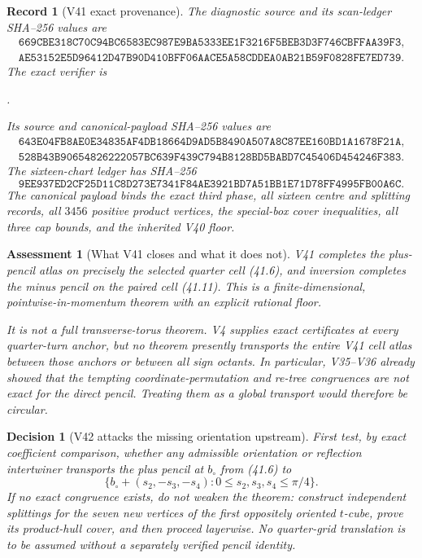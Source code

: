 \documentclass[11pt,oneside]{article}
\newtheorem{assessment}[theorem]{Assessment}
\newtheorem{record}[theorem]{Record}
\newtheorem{decision}[theorem]{Decision}
\theoremstyle{definition}
\theoremstyle{remark}
\begin{document}
\begin{record}[V41 exact provenance]
\label{rec:newv41-provenance}
The diagnostic source and its scan-ledger SHA--256 values are
\[
\begin{gathered}
\texttt{669CBE318C70C94BC6583EC987E9BA5333EE1F3216F5BEB3D3F746CBFFAA39F3},\\
\texttt{AE53152E5D96412D47B90D410BFF06AACE5A58CDDEA0AB21B59F0828FE7ED739}.
\end{gathered}                                         \tag{41.14}
\]
The exact verifier is
\begin{center}
\footnotesize
{}.
\end{center}
Its source and canonical-payload SHA--256 values are
\[
\begin{gathered}
\texttt{643E04FB8AE0E34835AF4DB18664D9AD5B8490A507A8C87EE160BD1A1678F21A},\\
\texttt{528B43B90654826222057BC639F439C794B8128BD5BABD7C45406D454246F383}.
\end{gathered}                                         \tag{41.15}
\]
The sixteen-chart ledger has SHA--256
\[
\texttt{9EE937ED2CF25D11C8D273E7341F84AE3921BD7A51BB1E71D78FF4995FB00A6C}.
                                                               \tag{41.16}
\]
The canonical payload binds the exact third phase, all sixteen
centre and splitting records, all \(3456\) positive product
vertices, the special-box cover inequalities, all three cap
bounds, and the inherited V40 floor.
\end{record}

\begin{assessment}[What V41 closes and what it does not]
\label{ass:newv41}
V41 completes the plus-pencil atlas on precisely the selected
quarter cell (41.6), and inversion completes the minus pencil on
the paired cell (41.11).  This is a finite-dimensional,
pointwise-in-momentum theorem with an explicit rational floor.

It is not a full transverse-torus theorem.  V4 supplies exact
certificates at every quarter-turn anchor, but no theorem presently
transports the entire V41 cell atlas between those anchors or
between all sign octants.  In particular, V35--V36 already showed
that the tempting coordinate-permutation and re-tree congruences
are not exact for the direct pencil.  Treating them as a global
transport would therefore be circular.
\end{assessment}

\begin{decision}[V42 attacks the missing orientation upstream]
\label{dec:newv41-next}
First test, by exact coefficient comparison, whether any admissible
orientation or reflection intertwiner transports the plus pencil
at \(b_\circ\) from (41.6) to
\[
 \{b_\circ+(s_2,-s_3,-s_4):
       0\le s_2,s_3,s_4\le\pi/4\}.                    \tag{41.17}
\]
If no exact congruence exists, do not weaken the theorem: construct
independent splittings for the seven new vertices of the first
oppositely oriented \(t\)-cube, prove its product-hull cover, and
then proceed layerwise.  No quarter-grid translation is to be
assumed without a separately verified pencil identity.
\end{decision}
\end{document}
